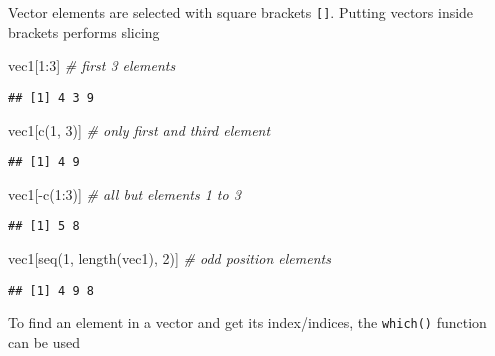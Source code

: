 \documentclass[
  oneside]{book}
\newenvironment{Shaded}{\begin{snugshade}}{\end{snugshade}}
\newcommand{\CommentTok}[1]{\textcolor[rgb]{0.56,0.35,0.01}{\textit{#1}}}
\newcommand{\DecValTok}[1]{\textcolor[rgb]{0.00,0.00,0.81}{#1}}
\newcommand{\FunctionTok}[1]{\textcolor[rgb]{0.00,0.00,0.00}{#1}}
\newcommand{\NormalTok}[1]{#1}
\newcommand{\SpecialCharTok}[1]{\textcolor[rgb]{0.00,0.00,0.00}{#1}}
\begin{document}
Vector elements are selected with square
brackets \texttt{{[}{]}}. Putting vectors inside brackets performs
slicing

\begin{Shaded}
\begin{Highlighting}[]
\NormalTok{vec1[}\DecValTok{1}\SpecialCharTok{:}\DecValTok{3}\NormalTok{] }\CommentTok{\# first 3 elements}
\end{Highlighting}
\end{Shaded}

\begin{verbatim}
## [1] 4 3 9
\end{verbatim}

\begin{Shaded}
\begin{Highlighting}[]
\NormalTok{vec1[}\FunctionTok{c}\NormalTok{(}\DecValTok{1}\NormalTok{, }\DecValTok{3}\NormalTok{)] }\CommentTok{\# only first and third element}
\end{Highlighting}
\end{Shaded}

\begin{verbatim}
## [1] 4 9
\end{verbatim}

\begin{Shaded}
\begin{Highlighting}[]
\NormalTok{vec1[}\SpecialCharTok{{-}}\FunctionTok{c}\NormalTok{(}\DecValTok{1}\SpecialCharTok{:}\DecValTok{3}\NormalTok{)] }\CommentTok{\# all but elements 1 to 3}
\end{Highlighting}
\end{Shaded}

\begin{verbatim}
## [1] 5 8
\end{verbatim}

\begin{Shaded}
\begin{Highlighting}[]
\NormalTok{vec1[}\FunctionTok{seq}\NormalTok{(}\DecValTok{1}\NormalTok{, }\FunctionTok{length}\NormalTok{(vec1), }\DecValTok{2}\NormalTok{)] }\CommentTok{\# odd position elements}
\end{Highlighting}
\end{Shaded}

\begin{verbatim}
## [1] 4 9 8
\end{verbatim}

To find an element in a vector and get its index/indices,
the \texttt{which()} function can be used
\end{document}
